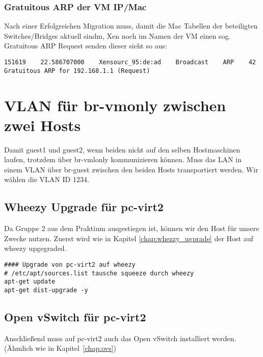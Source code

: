 \subsection{Gratuitous ARP der VM IP/Mac}

Nach einer Erfolgreichen Migration muss, damit die Mac Tabellen der beteiligten Switches/Bridges aktuell sindm, Xen noch im Namen der VM einen sog. Gratuitous ARP Request senden dieser sieht so aus:

\setupVerbatimOut
\begin{verbatim}
151619    22.586707000    Xensourc_95:de:ad    Broadcast    ARP    42    Gratuitous ARP for 192.168.1.1 (Request)
\end{verbatim}


\chapter{VLAN für br-vmonly zwischen zwei Hosts}

Damit guest1 und guest2, wenn beiden nicht auf den selben Hostmaschinen laufen, trotzdem über br-vmlonly kommunizieren können. Muss das LAN in einem VLAN über br-guest zwischen den beiden Hosts transportiert werden. Wir wählen die VLAN ID 1234.

\section {Wheezy Upgrade für pc-virt2}

Da Gruppe 2 aus dem Praktium ausgestiegen ist, können wir den Host für unsere Zwecke nutzen. Zuerst wird wie in Kapitel \ref{chap:whezzy_ugprade} der Host auf wheezy upgegraded.

\setupVerbatimOut
\begin{verbatim}
#### Upgrade von pc-virt2 auf wheezy 
# /etc/apt/sources.list tausche squeeze durch wheezy
apt-get update
apt-get dist-upgrade -y
\end{verbatim}


\section {Open vSwitch für pc-virt2}

Anschließend muss auf pc-virt2 auch das Open vSwitch installiert werden. (Ähmlich wie in Kapitel~\ref{chap:ovs})

